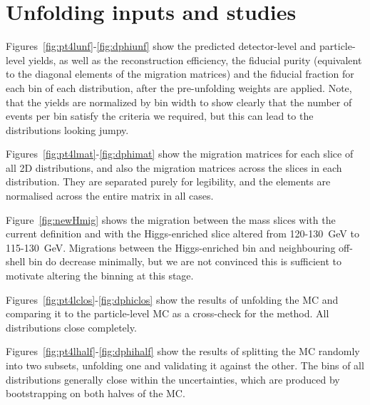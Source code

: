 \chapter{Unfolding inputs and studies}
Figures~\ref{fig:pt4lunf}-\ref{fig:dphiunf} show the predicted detector-level and particle-level yields, as well as the reconstruction efficiency, the fiducial purity (equivalent to the diagonal elements of the migration matrices) and the fiducial fraction for each bin of each distribution, after the pre-unfolding weights are applied. Note, that the yields are normalized by bin width to show clearly that the number of events per bin satisfy the criteria we required, but this can lead to the distributions looking jumpy.

Figures~\ref{fig:pt4lmat}-\ref{fig:dphimat} show the migration matrices for each slice of all 2D distributions, and also the migration matrices across the slices in each distribution. They are separated purely for legibility, and the elements are normalised across the entire matrix in all cases. 

Figure~\ref{fig:newHmig} shows the migration between the \mFourL mass slices with the current definition and with the Higgs-enriched slice altered from 120-130~GeV to 115-130~GeV. Migrations between the Higgs-enriched bin and neighbouring off-shell bin do decrease minimally, but we are not convinced this is sufficient to motivate altering the binning at this stage.

Figures~\ref{fig:pt4lclos}-\ref{fig:dphiclos} show the results of unfolding the MC and comparing it to the particle-level MC as a cross-check for the method. All distributions close completely. 

Figures~\ref{fig:pt4lhalf}-\ref{fig:dphihalf} show the results of splitting the MC randomly into two subsets, unfolding one and validating it against the other. The bins of all distributions generally close within the uncertainties, which are produced by bootstrapping on both halves of the MC. 


